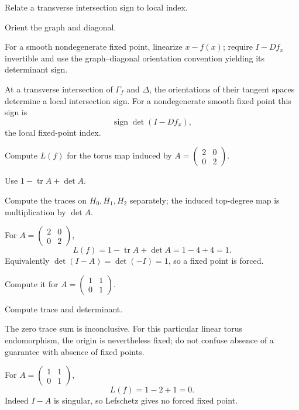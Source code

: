 \begin{exercise}\label{exr:viii35-12}
Relate a transverse intersection sign to local index.
\end{exercise}
\begin{hint}
Orient the graph and diagonal.

For a smooth nondegenerate fixed point, linearize \(x-f(x)\); require \(I-Df_x\) invertible and use the graph--diagonal orientation convention yielding its determinant sign.
\end{hint}
\begin{solution}
At a transverse intersection of \(\Gamma_f\) and \(\Delta\), the orientations of their tangent spaces determine a local intersection sign. For a nondegenerate smooth fixed point this sign is
\[
\operatorname{sign}\det(I-Df_x),
\]
the local fixed-point index.
\end{solution}

\begin{exercise}\label{exr:viii35-13}
Compute $L(f)$ for the torus map induced by $A=\begin{pmatrix}2&0\\0&2\end{pmatrix}$.
\end{exercise}
\begin{hint}
Use $1-\operatorname{tr}A+\det A$.

Compute the traces on \(H_0,H_1,H_2\) separately; the induced top-degree map is multiplication by \(\det A\).
\end{hint}
\begin{solution}
For \(A=\begin{pmatrix}2&0\\0&2\end{pmatrix}\),
\[
L(f)=1-\operatorname{tr}A+\det A=1-4+4=1.
\]
Equivalently \(\det(I-A)=\det(-I)=1\), so a fixed point is forced.
\end{solution}

\begin{exercise}\label{exr:viii35-14}
Compute it for $A=\begin{pmatrix}1&1\\0&1\end{pmatrix}$.
\end{exercise}
\begin{hint}
Compute trace and determinant.

The zero trace sum is inconclusive. For this particular linear torus endomorphism, the origin is nevertheless fixed; do not confuse absence of a guarantee with absence of fixed points.
\end{hint}
\begin{solution}
For \(A=\begin{pmatrix}1&1\\0&1\end{pmatrix}\),
\[
L(f)=1-2+1=0.
\]
Indeed \(I-A\) is singular, so Lefschetz gives no forced fixed point.
\end{solution}

